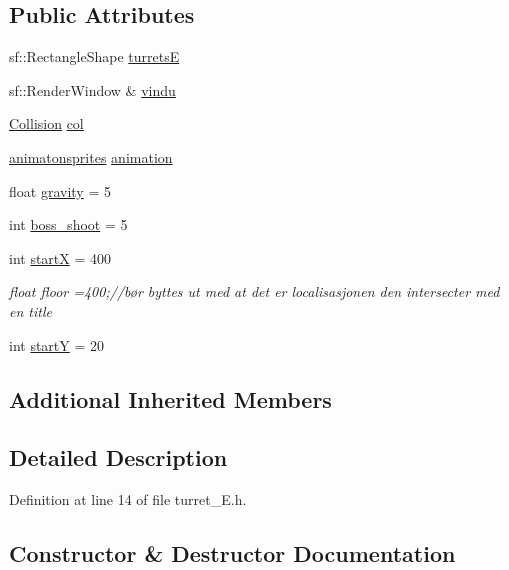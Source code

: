 \subsection*{Public Attributes}
\begin{DoxyCompactItemize}
\item 
sf\+::\+Rectangle\+Shape \hyperlink{classturret___e_a9c1a6a373f875b2d21c0e572a8158832}{turretsE}
\item 
sf\+::\+Render\+Window \& \hyperlink{classturret___e_a5c18e0101eee84677c2fade680335276}{vindu}
\item 
\hyperlink{class_collision}{Collision} \hyperlink{classturret___e_ad7bd8a3d29a005506463104ef6fb3d3b}{col}
\item 
\hyperlink{classanimatonsprites}{animatonsprites} \hyperlink{classturret___e_ad2b54ad13e3b615df89345329455c12f}{animation}
\item 
float \hyperlink{classturret___e_a9fd3b5de655d1e22c7706f5b3022fc81}{gravity} = 5
\item 
int \hyperlink{classturret___e_aded4c4573a33a16416b58b968219eed3}{boss\+\_\+shoot} = 5
\item 
int \hyperlink{classturret___e_a49fd9095bd80407fa9aaceb5a397d6ba}{startX} = 400
\begin{DoxyCompactList}\small\item\em float floor =400;//bør byttes ut med at det er localisasjonen den intersecter med en title \end{DoxyCompactList}\item 
int \hyperlink{classturret___e_a3236c69dff2e5d1aa3b83f7402b60877}{startY} = 20
\end{DoxyCompactItemize}
\subsection*{Additional Inherited Members}


\subsection{Detailed Description}


Definition at line 14 of file turret\+\_\+\+E.\+h.



\subsection{Constructor \& Destructor Documentation}
\hypertarget{classturret___e_a4094014d790c366a5f4d7d5ec80ce49b}{}\label{classturret___e_a4094014d790c366a5f4d7d5ec80ce49b} 
